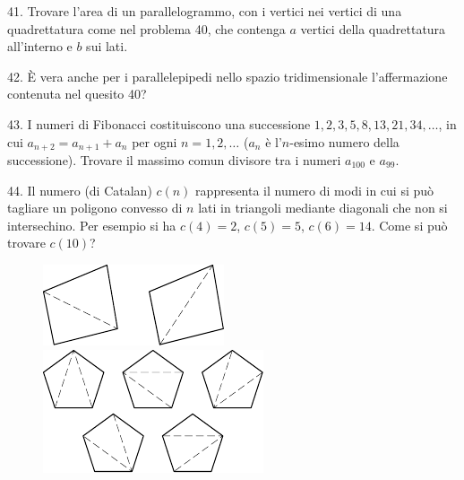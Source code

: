 \begin{problem}{41.}
	Trovare l’area di un parallelogrammo, con i vertici nei vertici di una quadrettatura come nel problema 40, che contenga $a$ vertici della quadrettatura all’interno e $b$ sui lati.
\end{problem}

\begin{problem}{42.}
	È vera anche per i parallelepipedi nello spazio tridimensionale l’affermazione contenuta nel quesito 40?
\end{problem}

\begin{problem}{43.}
	I numeri di Fibonacci costituiscono una successione $1,2,3,5,8,\allowbreak 13,21,34,\dotsc$, in cui $a_{n+2}=a_{n+1}+a_n$ per ogni
	$n=1,2,\dotsc$ ($a_n$ è l'$n$-esimo numero della successione). Trovare il massimo comun divisore tra i numeri $a_{100}$ e $a_{99}$.
\end{problem}

\begin{problem}{44.}
	Il numero (di Catalan) $c(n)$ rappresenta il numero di modi in cui  si può tagliare un poligono convesso di  $n$ lati in triangoli mediante diagonali che non si intersechino.
 Per esempio si ha $c(4)=2$, $c(5)=5$, $c(6)=14$. Come si può trovare $c(10)$?
	\begin{figure}
		\includegraphics{resources/taskbook-281}
		\qquad
		\includegraphics{resources/taskbook-282}
	\end{figure}
\end{problem}

